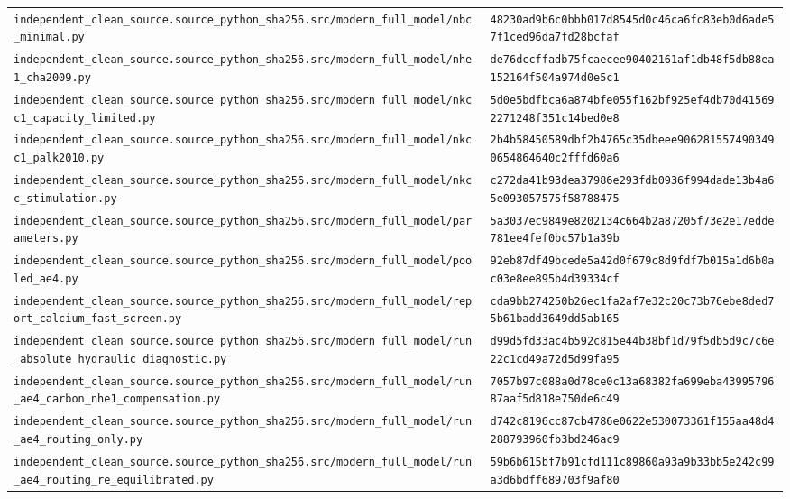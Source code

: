 \begin{longtable}{p{.46\linewidth}p{.46\linewidth}}
\nolinkurl{independent_clean_source.source_python_sha256.src/modern_full_model/nbc_minimal.py} & \nolinkurl{48230ad9b6c0bbb017d8545d0c46ca6fc83eb0d6ade57f1ced96da7fd28bcfaf} \\
\nolinkurl{independent_clean_source.source_python_sha256.src/modern_full_model/nhe1_cha2009.py} & \nolinkurl{de76dccffadb75fcaecee90402161af1db48f5db88ea152164f504a974d0e5c1} \\
\nolinkurl{independent_clean_source.source_python_sha256.src/modern_full_model/nkcc1_capacity_limited.py} & \nolinkurl{5d0e5bdfbca6a874bfe055f162bf925ef4db70d415692271248f351c14bed0e8} \\
\nolinkurl{independent_clean_source.source_python_sha256.src/modern_full_model/nkcc1_palk2010.py} & \nolinkurl{2b4b58450589dbf2b4765c35dbeee9062815574903490654864640c2fffd60a6} \\
\nolinkurl{independent_clean_source.source_python_sha256.src/modern_full_model/nkcc_stimulation.py} & \nolinkurl{c272da41b93dea37986e293fdb0936f994dade13b4a65e093057575f58788475} \\
\nolinkurl{independent_clean_source.source_python_sha256.src/modern_full_model/parameters.py} & \nolinkurl{5a3037ec9849e8202134c664b2a87205f73e2e17edde781ee4fef0bc57b1a39b} \\
\nolinkurl{independent_clean_source.source_python_sha256.src/modern_full_model/pooled_ae4.py} & \nolinkurl{92eb87df49bcede5a42d0f679c8d9fdf7b015a1d6b0ac03e8ee895b4d39334cf} \\
\nolinkurl{independent_clean_source.source_python_sha256.src/modern_full_model/report_calcium_fast_screen.py} & \nolinkurl{cda9bb274250b26ec1fa2af7e32c20c73b76ebe8ded75b61badd3649dd5ab165} \\
\nolinkurl{independent_clean_source.source_python_sha256.src/modern_full_model/run_absolute_hydraulic_diagnostic.py} & \nolinkurl{d99d5fd33ac4b592c815e44b38bf1d79f5db5d9c7c6e22c1cd49a72d5d99fa95} \\
\nolinkurl{independent_clean_source.source_python_sha256.src/modern_full_model/run_ae4_carbon_nhe1_compensation.py} & \nolinkurl{7057b97c088a0d78ce0c13a68382fa699eba4399579687aaf5d818e750de6c49} \\
\nolinkurl{independent_clean_source.source_python_sha256.src/modern_full_model/run_ae4_routing_only.py} & \nolinkurl{d742c8196cc87cb4786e0622e530073361f155aa48d4288793960fb3bd246ac9} \\
\nolinkurl{independent_clean_source.source_python_sha256.src/modern_full_model/run_ae4_routing_re_equilibrated.py} & \nolinkurl{59b6b615bf7b91cfd111c89860a93a9b33bb5e242c99a3d6bdff689703f9af80} \\

\end{longtable}
